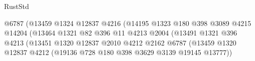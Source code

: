 \begin{lexlean}{RustStd}
\begin{coremodule}
{\begin{coremodule}
{{{{{{{{{{{{{{{{{{{{{{{{{{{{{{{                                                @6787
                                                (@13459
                                                  @1324
                                                  @12837
                                                  @4216
                                                  (@14195
                                                    @1323
                                                    @180
                                                    @398
                                                    @3089
                                                    @4215
                                                    @14204
                                                    (@13464
                                                      @1321
                                                      @82
                                                      @396
                                                      @11
                                                      @4213
                                                      @2004
                                                      (@13491
                                                        @1321
                                                        @396
                                                        @4213
                                                        (@13451
                                                          @1320
                                                          @12837
                                                          @2010
                                                          @4212
                                                          @2162
                                                          @6787
                                                          (@13459
                                                            @1320
                                                            @12837
                                                            @4212
                                                            (@19136
                                                              @728
                                                              @180
                                                              @398
                                                              @3629
                                                              @3139
                                                              @19145
                                                              @13777))
}}}}}}}}}}}}}}}}}}}}}}}}}}}}}}}
\end{coremodule}}
\end{coremodule}
\end{lexlean}
